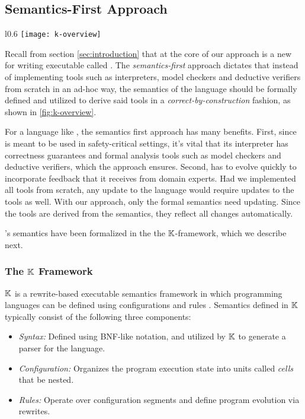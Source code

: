 \subsection{Semantics-First Approach}\label{subsec:semantics-first}
\begin{wrapfigure}{l}{0.6\textwidth}
  \centering
  \texttt{[image: k-overview]}
  \caption{\emph{Semantics-first} Approach} \label{fig:k-overview}
\end{wrapfigure}
Recall from section \ref{sec:introduction} that at the core of our approach
is a new \DSL{} for writing executable \BPGs{} called \MediK{}.
The \emph{semantics-first} approach dictates that instead of
implementing tools such as interpreters, model checkers and deductive verifiers
from scratch in an ad-hoc way, the semantics of the language should
be formally defined and utilized to derive said tools in a
\emph{correct-by-construction} fashion, as shown in \figurename{} \ref{fig:k-overview}.

For a language like \MediK{}, the semantics first approach has many benefits. First,
since \MediK{} is meant to be used in safety-critical settings,
it's vital that its interpreter has correctness guarantees and formal analysis
tools such as model checkers and deductive verifiers, which the approach ensures.
Second, \MediK{} has to evolve quickly to incorporate feedback that it receives from domain experts.
Had we implemented all tools from scratch, any update to the language would
require updates to the tools as well. With our approach, only the formal semantics
need updating. Since the tools are derived from the semantics, they reflect all
changes automatically.

\MediK{}'s semantics have been formalized in the the $\mathbb{K}{}$-framework, which
we describe next.

\subsubsection{The $\mathbb{K}{}$ Framework}
$\mathbb{K}$ is a rewrite-based executable semantics framework in which
programming languages can be defined
using configurations and rules \cite{KFrameworkURL}. Semantics
defined in $\mathbb{K}$ typically consist of the following three components:
\begin{itemize}
  \item \emph{Syntax:} Defined using BNF-like notation, and utilized
    by $\mathbb{K}{}$ to generate a parser for the language.
  \item \emph{Configuration:} Organizes the program execution state into
    units called \emph{cells} that be nested.
  \item \emph{Rules:} Operate over configuration segments and define
    program evolution via rewrites.
\end{itemize}

